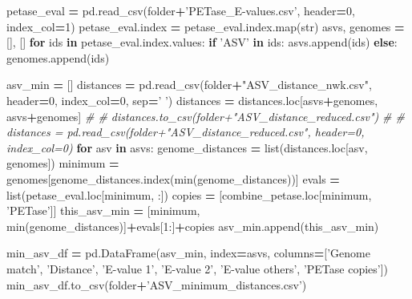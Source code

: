 \documentclass[
]{article}
\newenvironment{Shaded}{\begin{snugshade}}{\end{snugshade}}
\newcommand{\BuiltInTok}[1]{#1}
\newcommand{\CommentTok}[1]{\textcolor[rgb]{0.56,0.35,0.01}{\textit{#1}}}
\newcommand{\ControlFlowTok}[1]{\textcolor[rgb]{0.13,0.29,0.53}{\textbf{#1}}}
\newcommand{\DecValTok}[1]{\textcolor[rgb]{0.00,0.00,0.81}{#1}}
\newcommand{\KeywordTok}[1]{\textcolor[rgb]{0.13,0.29,0.53}{\textbf{#1}}}
\newcommand{\NormalTok}[1]{#1}
\newcommand{\OperatorTok}[1]{\textcolor[rgb]{0.81,0.36,0.00}{\textbf{#1}}}
\newcommand{\StringTok}[1]{\textcolor[rgb]{0.31,0.60,0.02}{#1}}
\begin{document}
\begin{Shaded}
\begin{Highlighting}[]
\NormalTok{petase_eval }\OperatorTok{=}\NormalTok{ pd.read_csv(folder}\OperatorTok{+}\StringTok{'PETase_E-values.csv'}\NormalTok{, header}\OperatorTok{=}\DecValTok{0}\NormalTok{, index_col}\OperatorTok{=}\DecValTok{1}\NormalTok{)}
\NormalTok{petase_eval.index }\OperatorTok{=}\NormalTok{ petase_eval.index.}\BuiltInTok{map}\NormalTok{(}\BuiltInTok{str}\NormalTok{)}
\NormalTok{asvs, genomes }\OperatorTok{=}\NormalTok{ [], []}
\ControlFlowTok{for}\NormalTok{ ids }\KeywordTok{in}\NormalTok{ petase_eval.index.values:}
  \ControlFlowTok{if} \StringTok{'ASV'} \KeywordTok{in}\NormalTok{ ids:}
\NormalTok{    asvs.append(ids)}
  \ControlFlowTok{else}\NormalTok{:}
\NormalTok{    genomes.append(ids)}

\NormalTok{asv_min }\OperatorTok{=}\NormalTok{ []}
\NormalTok{distances }\OperatorTok{=}\NormalTok{ pd.read_csv(folder}\OperatorTok{+}\StringTok{"ASV_distance_nwk.csv"}\NormalTok{, header}\OperatorTok{=}\DecValTok{0}\NormalTok{, index_col}\OperatorTok{=}\DecValTok{0}\NormalTok{, sep}\OperatorTok{=}\StringTok{' '}\NormalTok{)}
\NormalTok{distances }\OperatorTok{=}\NormalTok{ distances.loc[asvs}\OperatorTok{+}\NormalTok{genomes, asvs}\OperatorTok{+}\NormalTok{genomes]}
\CommentTok{# # distances.to_csv(folder+"ASV_distance_reduced.csv")}
\CommentTok{# # distances = pd.read_csv(folder+"ASV_distance_reduced.csv", header=0, index_col=0)}
\ControlFlowTok{for}\NormalTok{ asv }\KeywordTok{in}\NormalTok{ asvs:}
\NormalTok{  genome_distances }\OperatorTok{=} \BuiltInTok{list}\NormalTok{(distances.loc[asv, genomes])}
\NormalTok{  minimum }\OperatorTok{=}\NormalTok{ genomes[genome_distances.index(}\BuiltInTok{min}\NormalTok{(genome_distances))]}
\NormalTok{  evals }\OperatorTok{=} \BuiltInTok{list}\NormalTok{(petase_eval.loc[minimum, :])}
\NormalTok{  copies }\OperatorTok{=}\NormalTok{ [combine_petase.loc[minimum, }\StringTok{'PETase'}\NormalTok{]]}
\NormalTok{  this_asv_min }\OperatorTok{=}\NormalTok{ [minimum, }\BuiltInTok{min}\NormalTok{(genome_distances)]}\OperatorTok{+}\NormalTok{evals[}\DecValTok{1}\NormalTok{:]}\OperatorTok{+}\NormalTok{copies}
\NormalTok{  asv_min.append(this_asv_min)}

\NormalTok{min_asv_df }\OperatorTok{=}\NormalTok{ pd.DataFrame(asv_min, index}\OperatorTok{=}\NormalTok{asvs, columns}\OperatorTok{=}\NormalTok{[}\StringTok{'Genome match'}\NormalTok{, }\StringTok{'Distance'}\NormalTok{, }\StringTok{'E-value 1'}\NormalTok{, }\StringTok{'E-value 2'}\NormalTok{, }\StringTok{'E-value others'}\NormalTok{, }\StringTok{'PETase copies'}\NormalTok{])}
\NormalTok{min_asv_df.to_csv(folder}\OperatorTok{+}\StringTok{'ASV_minimum_distances.csv'}\NormalTok{)}
\end{Highlighting}
\end{Shaded}
\end{document}
